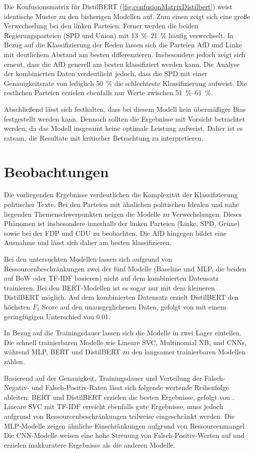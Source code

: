 Die Konfusionsmatrix für DistilBERT (\autoref{fig:confusionMatrixDistilbert}) weist identische Muster zu den bisherigen Modellen auf. Zum einen zeigt sich eine große Verwechselung bei den linken Parteien. Ferner werden die beiden Regierungsparteien (\ac{SPD} und Union) mit \SIrange{13}{21}{\percent} häufig verwechselt. In Bezug auf die Klassifizierung der Reden lassen sich die Parteien \ac{AfD} und Linke mit deutlichem Abstand am besten differenzieren. Insbesondere jedoch zeigt sich erneut, dass die \ac{AfD} generell am besten klassifiziert werden kann. Die Analyse der kombinierten Daten verdeutlicht jedoch, dass die \ac{SPD} mit einer Genauigkeitsrate von lediglich \SI{50}{\percent} die schlechteste Klassifizierung aufweist. Die restlichen Parteien erzielen ebenfalls nur Werte zwischen \SIrange{51}{61}{\percent}.

Abschließend lässt sich festhalten, dass bei diesem Modell kein übermäßiger Bias festgestellt werden kann. Dennoch sollten die Ergebnisse mit Vorsicht betrachtet werden, da das Modell insgesamt keine optimale Leistung aufweist. Daher ist es ratsam, die Resultate mit kritischer Betrachtung zu interpretieren.

\section{Beobachtungen}

Die vorliegenden Ergebnisse verdeutlichen die Komplexität der Klassifizierung politischer Texte. Bei den Parteien mit ähnlichen politischen Idealen und nahe liegenden Themenschwerpunkten neigen die Modelle zu Verwechslungen. Dieses Phänomen ist insbesondere innerhalb der linken Parteien (Linke, \ac{SPD}, Grüne) sowie bei der \ac{FDP} und \ac{CDU} zu beobachten. Die \ac{AfD} hingegen bildet eine Ausnahme und lässt sich daher am besten klassifizieren.

Bei den untersuchten Modellen lassen sich aufgrund von Ressourcenbeschränkungen zwei der fünf Modelle (Baseline und \ac{MLP}, die beiden auf \ac{BoW} oder \ac{TF-IDF} basieren) nicht auf dem kombinierten Datensatz trainieren. Bei den BERT-Modellen ist es sogar nur mit dem kleineren DistilBERT möglich. Auf dem kombinierten Datensatz erzielt DistilBERT den höchsten \(F_1\) Score auf den unausgeglichenen Daten, gefolgt von \ft mit einem geringfügigen Unterschied von \num{0.01}.

In Bezug auf die Trainingsdauer lassen sich die Modelle in zwei Lager einteilen. Die schnell trainierbaren Modelle wie Lineare \ac{SVC}, Multinomial \ac{NB}, \ft und \acp{CNN}, während \ac{MLP}, \ac{BERT} und DistilBERT zu den langsamer trainierbaren Modellen zählen.

Basierend auf der Genauigkeit, Trainingsdauer und Verteilung der Falsch-Negativ- und Falsch-Positiv-Raten lässt sich folgende wertende Reihenfolge ableiten: \ac{BERT} und DistilBERT erzielen die besten Ergebnisse, gefolgt von \ft. Lineare \ac{SVC} mit \ac{TF-IDF} erreicht ebenfalls gute Ergebnisse, muss jedoch aufgrund von Ressourcenbeschränkungen teilweise eingeschränkt werden. Die \ac{MLP}-Modelle zeigen ähnliche Einschränkungen aufgrund von Ressourcenmangel. Die \ac{CNN}-Modelle weisen eine hohe Streuung von Falsch-Positiv-Werten auf und erzielen inakkuratere Ergebnisse als die anderen Modelle.
